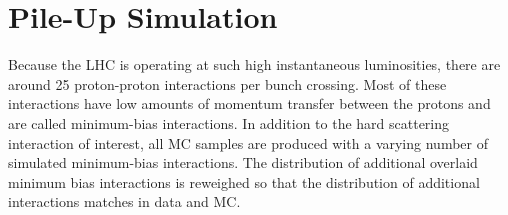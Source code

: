 \section{Pile-Up Simulation}
\label{sec:MC:PileUp}

\indent Because the LHC is operating at such high instantaneous luminosities, there are around 25 proton-proton interactions per bunch crossing.  Most of these interactions have low amounts of momentum transfer between the protons and are called minimum-bias interactions.  In addition to the hard scattering interaction of interest, all MC samples are produced with a varying number of simulated minimum-bias interactions.  The distribution of additional overlaid minimum bias interactions is reweighed so that the distribution of additional interactions matches in data and MC.  \\

